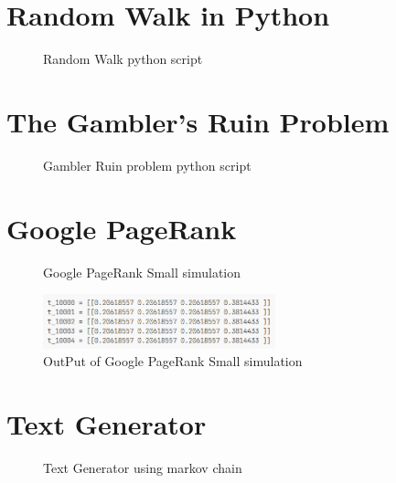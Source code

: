 \chapter{Random Walk in Python}
\begin{figure}[H]
    \centering
    
    \caption{Random Walk python script}
    \label{RandomWalp python script}
    \centering
\end{figure}

\chapter{The Gambler’s Ruin Problem}
\begin{figure}[H]
    \centering
    
    \caption{Gambler Ruin problem python script}
    \label{GamblerRuind python script}
\end{figure}

\chapter{Google PageRank}
\begin{figure}[H]
    \centering
    
    \caption{Google PageRank Small simulation}
    \label{PageRank}
\end{figure}
\begin{figure}[H]
    \centering
    \includegraphics[width=0.6\textwidth]{pic/output of PageRank.png}
    \caption{OutPut of Google PageRank Small simulation}
    \label{OutPut Of GooglePageRank}
\end{figure}

\chapter{Text Generator}
\begin{figure}[H]
    \centering
    
    \caption{Text Generator using markov chain}
    \label{fig:}
\end{figure}
